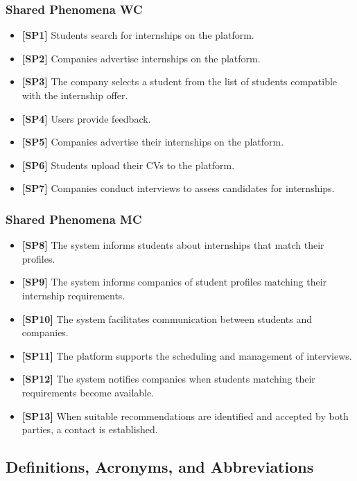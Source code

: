 \documentclass[12pt]{article}
\numberwithin{figure}{section}
\numberwithin{table}{section}
\begin{document}
\subsubsection{Shared Phenomena WC}
\begin{itemize}
    \item \textbf{[SP1]} Students search for internships on the platform.
    \item \textbf{[SP2]} Companies advertise internships on the platform. 
    \item \textbf{[SP3]} The company selects a student from the list of students compatible with the internship offer. 
    \item \textbf{[SP4]} Users provide feedback. 
    \item \textbf{[SP5]} Companies advertise their internships on the platform. 
    \item \textbf{[SP6]} Students upload their CVs to the platform. 
    \item \textbf{[SP7]} Companies conduct interviews to assess candidates for internships. 
\end{itemize}

\subsubsection{Shared Phenomena MC}
\begin{itemize}
     \item \textbf{[SP8]} The system informs students about internships that match their profiles. 
    \item \textbf{[SP9]} The system informs companies of student profiles matching their internship requirements. 
    \item \textbf{[SP10]} The system facilitates communication between students and companies. 
    \item \textbf{[SP11]} The platform supports the scheduling and management of interviews. 
    \item \textbf{[SP12]} The system notifies companies when students matching their requirements become available. 
    \item \textbf{[SP13]} When suitable recommendations are identified and accepted by both parties, a contact is established. 
\end{itemize}

\subsection{Definitions, Acronyms, and Abbreviations}
\end{document}
